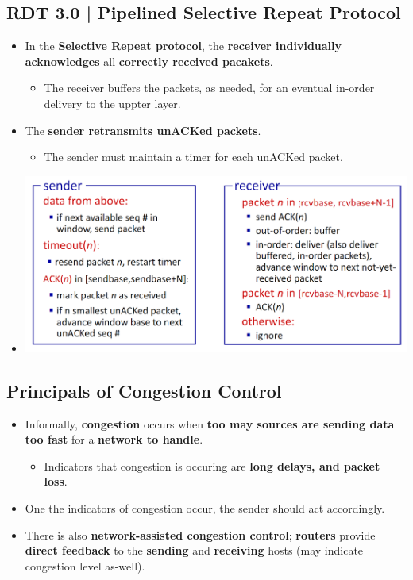 \documentclass{article}
\begin{document}
    \subsection*{RDT 3.0 | Pipelined Selective Repeat Protocol}
    \begin{itemize}
        \item In the \textbf{Selective Repeat protocol}, the \textbf{receiver individually acknowledges} all \textbf{correctly received pacakets}.
        \begin{itemize}
            \item The receiver buffers the packets, as needed, for an eventual in-order delivery to the uppter layer.
        \end{itemize}
        \item The \textbf{sender retransmits unACKed packets}.
        \begin{itemize}
            \item The sender must maintain a timer for each unACKed packet.
        \end{itemize}
        \item[] \includegraphics*[width=\textwidth - 25pt]{images/Selective-Repeat-Protocol.PNG}
    \end{itemize}

    \subsection*{Principals of Congestion Control}
    \begin{itemize}
        \item Informally, \textbf{congestion} occurs when \textbf{too may sources are sending data too fast} for a \textbf{network to handle}.
        \begin{itemize}
            \item Indicators that congestion is occuring are \textbf{long delays, and packet loss}.
        \end{itemize}
        \item One the indicators of congestion occur, the sender should act accordingly.
        \item There is also \textbf{network-assisted congestion control}; \textbf{routers} provide \textbf{direct feedback} to the \textbf{sending} and \textbf{receiving} hosts (may indicate congestion level as-well).
    \end{itemize}
\end{document}
